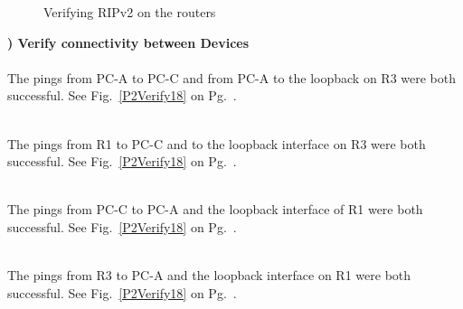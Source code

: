 \documentclass{report}
\newcommand{\mysubsection}[2]{\textbf{\romannumeral #1) #2}}
\begin{document}
\begin{figure}[!hbt]
\par
\caption{Verifying RIPv2 on the routers}
\label{P2RipB18}
\end{figure}

\clearpage

\noindent\mysubsection{4}{Verify connectivity between Devices}\\
\\
The pings from PC-A to PC-C and from PC-A to the loopback on R3 were both
successful. See
Fig.~\ref{P2Verify18} on Pg.~\pageref{P2Verify18}.

\\
The pings from R1 to PC-C and to the loopback interface on R3 were both successful. See
Fig.~\ref{P2Verify18} on Pg.~\pageref{P2Verify18}.

\\
The pings from PC-C to PC-A and the loopback interface of R1 were both
successful. See
Fig.~\ref{P2Verify18} on Pg.~\pageref{P2Verify18}.

\\
The pings from R3 to PC-A and the loopback interface on R1 were both successful. See
Fig.~\ref{P2Verify18} on Pg.~\pageref{P2Verify18}.
\end{document}
